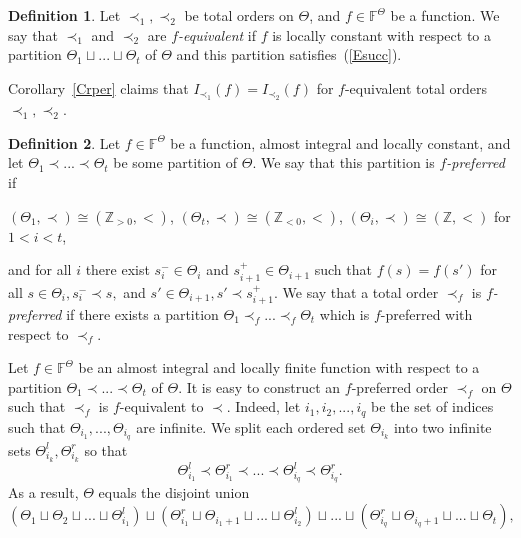 \documentclass[10pt]{amsart}\oddsidemargin -1mm \evensidemargin -1mm \topmargin -15mm\headheight5mm \headsep 3.5mm \textheight 245mm\textwidth 170mm
\theoremstyle{definition}\newtheorem{theorem}{Theorem}[section]\newtheorem{lemma}[theorem]{Lemma}\newtheorem{remark}[theorem]{Remark}\newtheorem{proposition}[theorem]{Proposition}\newtheorem{corollary}[theorem]{Corollary}\newtheorem{definition}[theorem]{Definition}\newtheorem{Ex}[theorem]{Example}\newtheorem{obs}[theorem]{Observation}\newtheorem{nota}[theorem]{Notation}
\begin{document}
\begin{definition} Let $\prec_1,\prec_2$ be total orders on $\Theta$, and $f\in\mathbb F^\Theta$ be a function. 
We say that $\prec_1$ and $\prec_2$ are {\it $f$-equivalent} if $f$ is locally constant with respect to a partition $\Theta_1\sqcup ...\sqcup \Theta_t$ of $\Theta$ and this partition satisfies~(\ref{Esucc}).\end{definition}
Corollary~\ref{Crper} claims that $I_{\prec_1}(f)=I_{\prec_2}(f)$ for $f$-equivalent total orders $\prec_1, \prec_2$. 
\begin{definition} Let $f\in\mathbb F^{\Theta}$ be a function, almost integral and locally constant, and let $\Theta_1\prec...\prec \Theta_t$ be some partition of $\Theta$. 
We say that this partition is {\it $f$-preferred} if 

\begin{center}$(\Theta_1, \prec)\cong(\mathbb Z_{>0}, <)$, $(\Theta_t, \prec)\cong(\mathbb Z_{<0}, <)$, $(\Theta_i, \prec)\cong(\mathbb Z, <)$ for $1<i<t$,\end{center}
and for all $i$ there exist $s_i^-\in \Theta_i$ and $s_{i+1}^+\in \Theta_{i+1}$ such that $f(s)=f(s')$ for all $s\in \Theta_i, s_i^-\prec s,$ and $s'\in \Theta_{i+1}, s'\prec s_{i+1}^+$. 
We say that a total order $\prec_f$ is {\it $f$-preferred} if there exists a partition $\Theta_1\prec_f...\prec_f \Theta_t$ which is $f$-preferred with respect to $\prec_f$.\end{definition}
Let $f\in\mathbb F^{\Theta}$ be an almost integral and locally finite function with respect to a partition $\Theta_1\prec...\prec \Theta_t$ of $\Theta$. 
It is easy to construct an $f$-preferred order $\prec_f$ on $\Theta$ such that $\prec_f$ is $f$-equivalent to $\prec$. 
Indeed, let $i_1, i_2,..., i_q$ be the set of indices such that $\Theta_{i_1},..., \Theta_{i_q}$ are infinite. 
We split each ordered set $\Theta_{i_k}$ into two infinite sets $\Theta_{i_k}^l, \Theta_{i_k}^r$ so that
$$\Theta_{i_1}^l\prec \Theta_{i_1}^r\prec...\prec \Theta_{i_{q}}^l\prec \Theta_{i_{q}}^r.$$
As a result, $\Theta$ equals the disjoint union
\begin{equation}(\Theta_1\sqcup \Theta_2\sqcup...\sqcup \Theta_{i_1}^l)\sqcup(\Theta_{i_1}^r\sqcup \Theta_{i_1+1}\sqcup...\sqcup \Theta_{i_2}^l)\sqcup...\sqcup (\Theta_{i_q}^r\sqcup \Theta_{i_q+1}\sqcup...\sqcup \Theta_t),\label{Eorddec}\end{equation}
\end{document}
